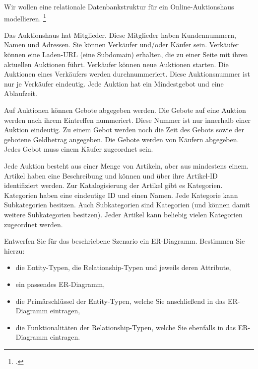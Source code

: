 \documentclass{bschlangaul-aufgabe}
\begin{document}

Wir wollen eine relationale Datenbankstruktur für ein
Online-Auktionshaus modellieren.
\footcite{examen:66116:2015:09}

Das Auktionshaus hat Mitglieder. Diese Mitglieder haben Kundennummern,
Namen und Adressen. Sie können Verkäufer und/oder Käufer sein. Verkäufer
können eine Laden-URL (eine Subdomain) erhalten, die zu einer Seite mit
ihren aktuellen Auktionen führt. Verkäufer können neue Auktionen
starten. Die Auktionen eines Verkäufers werden durchnummeriert. Diese
Auktionsnummer ist nur je Verkäufer eindeutig. Jede Auktion hat ein
Mindestgebot und eine Ablaufzeit.

Auf Auktionen können Gebote abgegeben werden. Die Gebote auf eine
Auktion werden nach ihrem Eintreffen nummeriert. Diese Nummer ist nur
innerhalb einer Auktion eindeutig. Zu einem Gebot werden noch die Zeit
des Gebots sowie der gebotene Geldbetrag angegeben. Die Gebote werden
von Käufern abgegeben. Jedes Gebot muss einem Käufer zugeordnet sein.

Jede Auktion besteht aus einer Menge von Artikeln, aber aus mindestens
einem. Artikel haben eine Beschreibung und können und über ihre
Artikel-ID identifiziert werden. Zur Katalogisierung der Artikel gibt es
Kategorien. Kategorien haben eine eindeutige ID und einen Namen. Jede
Kategorie kann Subkategorien besitzen. Auch Subkategorien sind
Kategorien (und können damit weitere Subkategorien besitzen). Jeder
Artikel kann beliebig vielen Kategorien zugeordnet werden.

Entwerfen Sie für das beschriebene Szenario ein ER-Diagramm. Bestimmen
Sie hierzu:

\begin{itemize}
\item die Entity-Typen, die Relationship-Typen und jeweils deren
Attribute,

\item ein passendes ER-Diagramm,

\item die Primärschlüssel der Entity-Typen, welche Sie anschließend in
das ER-Diagramm eintragen,

\item die Funktionalitäten der Relationship-Typen, welche Sie ebenfalls
in das ER-Diagramm eintragen.
\end{itemize}
\end{document}

